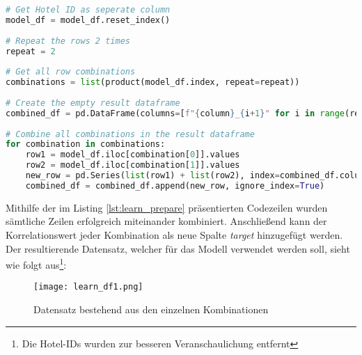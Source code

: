 \begin{lstlisting}[language=Python, label=lst:learn_prepare, caption=Erstellen des kombinierten Datensatzes]
# Get Hotel ID as seperate column
model_df = model_df.reset_index()
    
# Repeat the rows 2 times
repeat = 2
    
# Get all row combinations 
combinations = list(product(model_df.index, repeat=repeat))
    
# Create the empty result dataframe
combined_df = pd.DataFrame(columns=[f"{column}_{i+1}" for i in range(repeat) for column in model_df.columns])
    
# Combine all combinations in the result dataframe
for combination in combinations:
    row1 = model_df.iloc[combination[0]].values
    row2 = model_df.iloc[combination[1]].values
    new_row = pd.Series(list(row1) + list(row2), index=combined_df.columns)
    combined_df = combined_df.append(new_row, ignore_index=True)
\end{lstlisting}

Mithilfe der im Listing \ref{lst:learn_prepare} präsentierten Codezeilen wurden sämtliche Zeilen erfolgreich miteinander kombiniert. Anschließend kann der Korrelationswert jeder Kombination als neue Spalte \emph{target} hinzugefügt werden.
\newline
\newline
Der resultierende Datensatz, welcher für das Modell verwendet werden soll, sieht wie folgt aus\footnote{Die Hotel-IDs wurden zur besseren Veranschaulichung entfernt}:

\begin{figure}[h]
    \centering
    \texttt{[image: learn\_df1.png]}
    \caption[Datensatz bestehend aus den einzelnen Kombinationen]{Datensatz bestehend aus den einzelnen Kombinationen}
    \label{img:learn_df1}
\end{figure}

